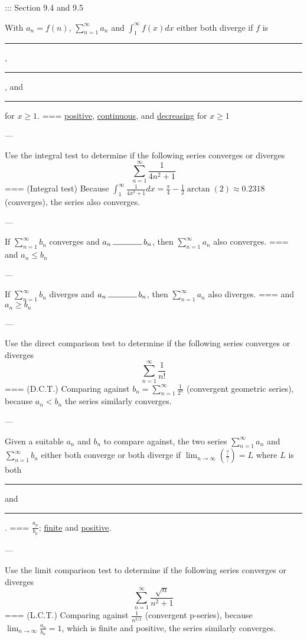::: Section 9.4 and 9.5


With \(a_n=f(n)\), \(\sum_{n=1}^\infty a_n\) and \(\int_1^\infty f(x)dx\)
either both diverge if \(f\) is \rule{1cm}{0.15mm}, \rule{1cm}{0.15mm}, and
\rule{1cm}{0.15mm} for \(x\geq 1\).
===
\underline{positive}, \underline{continuous}, and \underline{decreasing} for
\(x\geq 1\)

---

Use the integral test to determine if the following series converges or diverges
\[\sum_{n=1}^\infty \frac{1}{4n^2+1}\]
===
(Integral test) Because \(\int_1^\infty
\frac{1}{4x^2+1}dx=\frac{\pi}{4}-\frac{1}{2}\arctan(2)\approx 0.2318\)
(converges), the series also converges.

---


If \(\sum_{n=1}^\infty b_n\) converges and \(a_n\,\rule{1.25cm}{0.15mm}\,b_n\),
then \(\sum_{n=1}^\infty a_n\) also converges.
===
and \(a_n\leq b_n\)

---

If \(\sum_{n=1}^\infty b_n\) diverges and \(a_n\,\rule{1.25cm}{0.15mm}\,b_n\),
then \(\sum_{n=1}^\infty a_n\) also diverges.
===
and \(a_n\geq b_n\)

---

Use the direct comparison test to determine if the following series converges or
diverges
\[\sum_{n=1}^\infty \frac{1}{n!}\]
===
(D.C.T.) Comparing against \(b_n=\sum_{n=1}^\infty \frac{1}{2^n}\) (convergent
geometric series), because \(a_n<b_n\) the series similarly converges.

---


Given a suitable \(a_n\) and \(b_n\) to compare against, the two series
\(\sum_{n=1}^\infty a_n\) and \(\sum_{n=1}^\infty b_n\) either both converge or
both diverge if
\(\lim_{n\to\infty}\left(\frac{\underline{?}}{\underline{?}}\right)=L\) where
\(L\) is both \rule{1cm}{0.15mm} and \rule{1cm}{0.15mm}.
===
\(\frac{\underline{a_n}}{\underline{b_n}}\); \underline{finite} and
\underline{positive}.

---

Use the limit comparison test to determine if the following series converges or
diverges
\[\sum_{n=1}^\infty \frac{\sqrt{n}}{n^2+1}\]
===
(L.C.T.) Comparing against \(\frac{1}{n^{3/2}}\) (convergent p-series), because
\(\lim_{n\to\infty}\frac{a_n}{b_n}=1\), which is finite and positive, the series
similarly converges.

